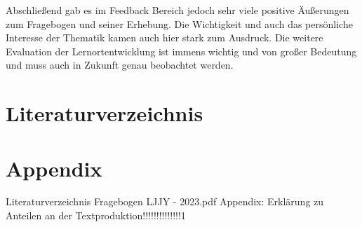 \documentclass[11pt, a4paper]{article}
\begin{document}
Abschließend gab es im Feedback Bereich jedoch sehr viele positive Äußerungen zum Fragebogen und seiner Erhebung. Die Wichtigkeit und auch das persönliche Interesse der Thematik kamen auch hier stark zum Ausdruck. Die weitere Evaluation der Lernortentwicklung ist immens wichtig und von großer Bedeutung und muss auch in Zukunft genau beobachtet werden.






\newpage
\newpage
\section{Literaturverzeichnis}
\newpage
\section{Appendix}
 Literaturverzeichnis
\newpage 
 {Fragebogen LJJY - 2023.pdf}
\newpage Appendix: Erklärung zu Anteilen an der Textproduktion!!!!!!!!!!!!!!1
\end{document}
